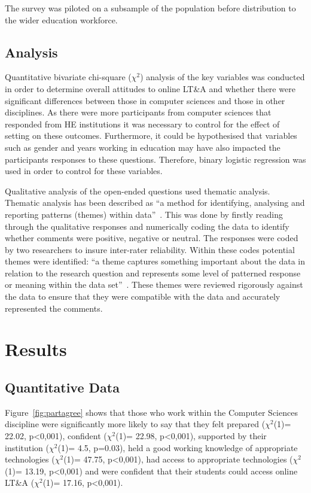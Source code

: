 \documentclass[sigconf]{acmart}
\begin{document}
The survey was piloted on a subsample of the population before
distribution to the wider education workforce.

\subsection{Analysis}

Quantitative bivariate chi-square ($\chi^2$) analysis of the key variables
was conducted in order to determine overall attitudes to online LT\&A
and whether there were significant differences between those in
computer sciences and those in other disciplines.  As there were more
participants from computer sciences that responded from HE
institutions it was necessary to control for the effect of setting on
these outcomes. Furthermore, it could be hypothesised that variables
such as gender and years working in education may have also impacted
the participants responses to these questions. Therefore, binary
logistic regression was used in order to control for these variables.

Qualitative analysis of the open-ended questions used thematic
analysis. Thematic analysis has been described as ``a method for
identifying, analysing and reporting patterns (themes) within
data''~\cite[p.78]{braun+clarke:2006}. This was done by firstly reading
through the qualitative responses and numerically coding the data to
identify whether comments were positive, negative or neutral. The
responses were coded by two researchers to insure inter-rater
reliability. Within these codes potential themes were identified: ``a
theme captures something important about the data in relation to the
research question and represents some level of patterned response or
meaning within the data set''~\cite[p.82]{braun+clarke:2006}. These
themes were reviewed rigorously against the data to ensure that they
were compatible with the data and accurately represented the comments. 

\section{Results}\label{results}

\subsection{Quantitative Data}\label{quantdata}

Figure~\ref{fig:partagree} shows that those who work within the
Computer Sciences discipline were significantly more likely to say
that they felt prepared ($\chi^2$(1)= 22.02, p<0,001), confident
($\chi^2$(1)= 22.98, p<0,001), supported by their institution
($\chi^2$(1)= 4.5, p=0.03), held a good working knowledge of
appropriate technologies ($\chi^2$(1)= 47.75, p<0,001), had access to
appropriate technologies ($\chi^2$(1)= 13.19, p<0,001) and were
confident that their students could access online LT\&A ($\chi^2$(1)=
17.16, p<0,001).
\end{document}
